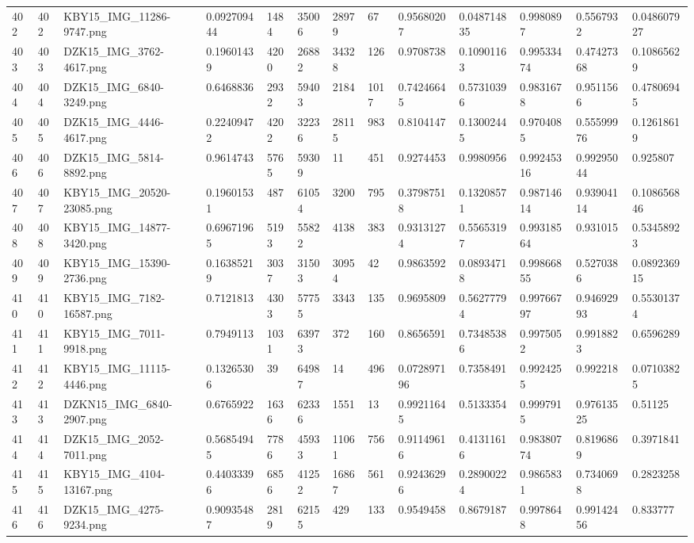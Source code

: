 \documentclass[11pt, a4paper, twoside]{report}
\begin{document}
\begin{longtable}[c]{@{}lllllllllllll@{}}
402 & 402 & KBY15\_IMG\_11286-9747.png & 0.092709444 & 1484 & 35006 & 28979 & 67 & 0.95680207 & 0.048714835 & 0.9980897 & 0.5567932 & 0.048607927 \\
403 & 403 & DZK15\_IMG\_3762-4617.png & 0.19601439 & 4200 & 26882 & 34328 & 126 & 0.9708738 & 0.10901163 & 0.99533474 & 0.47427368 & 0.10865629 \\
404 & 404 & DZK15\_IMG\_6840-3249.png & 0.6468836 & 2932 & 59403 & 2184 & 1017 & 0.74246645 & 0.57310396 & 0.9831678 & 0.9511566 & 0.47806945 \\
405 & 405 & DZK15\_IMG\_4446-4617.png & 0.22409472 & 4202 & 32236 & 28115 & 983 & 0.8104147 & 0.13002445 & 0.9704085 & 0.55599976 & 0.12618619 \\
406 & 406 & DZK15\_IMG\_5814-8892.png & 0.9614743 & 5765 & 59309 & 11 & 451 & 0.9274453 & 0.9980956 & 0.99245316 & 0.99295044 & 0.925807 \\
407 & 407 & KBY15\_IMG\_20520-23085.png & 0.19601531 & 487 & 61054 & 3200 & 795 & 0.37987518 & 0.13208571 & 0.98714614 & 0.93904114 & 0.108656846 \\
408 & 408 & KBY15\_IMG\_14877-3420.png & 0.69671965 & 5193 & 55822 & 4138 & 383 & 0.93131274 & 0.55653197 & 0.99318564 & 0.931015 & 0.53458923 \\
409 & 409 & KBY15\_IMG\_15390-2736.png & 0.16385219 & 3037 & 31503 & 30954 & 42 & 0.9863592 & 0.08934718 & 0.99866855 & 0.5270386 & 0.089236915 \\
410 & 410 & KBY15\_IMG\_7182-16587.png & 0.7121813 & 4303 & 57755 & 3343 & 135 & 0.9695809 & 0.56277794 & 0.99766797 & 0.94692993 & 0.55301374 \\
411 & 411 & KBY15\_IMG\_7011-9918.png & 0.7949113 & 1031 & 63973 & 372 & 160 & 0.8656591 & 0.73485386 & 0.9975052 & 0.9918823 & 0.6596289 \\
412 & 412 & KBY15\_IMG\_11115-4446.png & 0.13265306 & 39 & 64987 & 14 & 496 & 0.072897196 & 0.7358491 & 0.9924255 & 0.992218 & 0.07103825 \\
413 & 413 & DZKN15\_IMG\_6840-2907.png & 0.6765922 & 1636 & 62336 & 1551 & 13 & 0.99211645 & 0.5133354 & 0.9997915 & 0.97613525 & 0.51125 \\
414 & 414 & DZK15\_IMG\_2052-7011.png & 0.56854945 & 7786 & 45933 & 11061 & 756 & 0.91149616 & 0.41311616 & 0.98380774 & 0.8196869 & 0.3971841 \\
415 & 415 & KBY15\_IMG\_4104-13167.png & 0.44033396 & 6856 & 41252 & 16867 & 561 & 0.92436296 & 0.28900224 & 0.9865831 & 0.7340698 & 0.2823258 \\
416 & 416 & DZK15\_IMG\_4275-9234.png & 0.90935487 & 2819 & 62155 & 429 & 133 & 0.9549458 & 0.8679187 & 0.9978648 & 0.99142456 & 0.833777 \\

\end{longtable}
\end{document}
